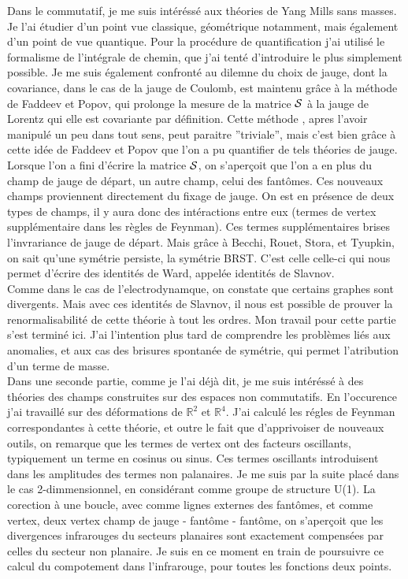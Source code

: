 \documentclass[a4paper,11pt]{article}
\theoremstyle{plain}
\theoremstyle{definition}
\theoremstyle{remark}
\numberwithin{equation}{section}
\numberwithin{equation}{subsection}
\numberwithin{figure}{section}
\begin{document}
Dans le commutatif, je me suis intéréssé aux théories de Yang Mills sans masses. Je l'ai étudier d'un point vue classique, géométrique 
notamment, mais également d'un point de vue quantique. Pour la procédure de quantification j'ai utilisé le formalisme de l'intégrale de 
chemin, que j'ai tenté d'introduire le plus simplement possible. Je me suis également confronté au dilemne du choix de jauge, dont la 
covariance, dans le cas de la jauge de Coulomb, est maintenu grâce à la méthode de Faddeev et Popov, qui prolonge la mesure de la 
matrice $\cal{S}$ à la jauge de Lorentz qui elle est covariante par définition. Cette méthode , apres l'avoir manipulé un peu dans tout 
sens, peut paraitre ''triviale'', mais c'est bien grâce à cette idée de Faddeev et Popov que l'on a pu quantifier de tels théories de 
jauge. Lorsque l'on a fini d'écrire la matrice $\cal{S}$, on s'aperçoit que l'on a en plus du champ de jauge de départ, un autre champ,
celui des fantômes. Ces nouveaux champs proviennent directement du fixage de jauge. On est en présence de deux types de champs, il y aura 
donc des intéractions entre eux (termes de vertex supplémentaire dans les règles de Feynman). Ces termes supplémentaires brises l'invrariance
de jauge de départ. Mais grâce à Becchi, Rouet, Stora, et Tyupkin, on sait qu'une symétrie persiste, la symétrie BRST. C'est celle celle-ci 
qui nous permet d'écrire des identités de Ward, appelée identités de Slavnov. \\
Comme dans le cas de l'electrodynamque, on constate que certains graphes sont divergents. Mais avec ces identités de Slavnov, il nous est possible 
de prouver la renormalisabilité de cette théorie à tout les ordres. Mon travail pour cette partie s'est terminé ici. J'ai l'intention plus tard de 
comprendre les problèmes liés aux anomalies, et aux cas des brisures spontanée de symétrie, qui permet l'atribution d'un terme de masse. \\

Dans une seconde partie, comme je l'ai déjà dit, je me suis intéréssé à des théories des champs construites sur des espaces non commutatifs. 
En l'occurence j'ai travaillé sur des déformations de $\mathbb{R}^{2}$ et $\mathbb{R}^{4}$. J'ai calculé les régles de Feynman correspondantes 
à cette théorie, et outre le fait que d'apprivoiser de nouveaux outils, on remarque que les termes de vertex ont des facteurs oscillants, 
typiquement un terme en cosinus ou sinus. Ces termes oscillants introduisent dans les amplitudes des termes non palanaires. Je me suis par la 
suite placé dans le cas 2-dimmensionnel, en considérant comme groupe de structure U(1). La corection à une boucle, avec comme lignes externes des 
fantômes, et comme vertex, deux vertex champ de jauge - fantôme - fantôme, on s'aperçoit que les divergences infrarouges du secteurs planaires 
sont exactement compensées par celles du secteur non planaire. Je suis en ce moment en train de poursuivre ce calcul du compotement dans l'infrarouge, 
pour toutes les fonctions deux points.\\
\end{document}
